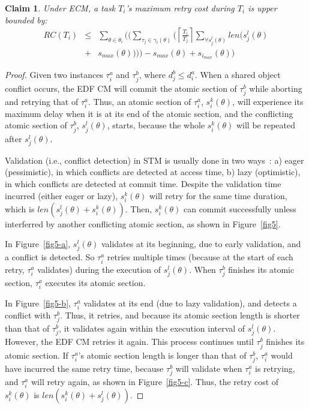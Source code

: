 \documentclass{sig-alternate}
\newtheorem{clm}{Claim}
\begin{document}
\begin{clm}\label{gedf-edf}
Under ECM, a task $T_i$'s maximum retry cost during $T_i$ is upper bounded by:
\begin{eqnarray}
RC\left(T_{i}\right) & \le & \sum_{\theta\in\theta_{i}}\Bigg(\Big(\sum_{\tau_{j}\in\gamma_i(\theta)}\Big(\left\lceil\frac{T_{i}}{T_{j}}\right\rceil\sum_{\forall s_{j}^{l}(\theta)}len\big(s_{j}^{l}(\theta)\nonumber \\
 & + & s_{max}(\theta)\big)\Big)\Big)-s_{max}(\theta)+s_{i_{max}}(\theta)\Bigg)\label{eq3}\end{eqnarray}
\end{clm}
\begin{proof}
Given two instances $\tau_{i}^a$ and $\tau_{j}^b$, where $d_j^b \le d_i^a$. When a shared object conflict occurs, the EDF CM will commit the atomic section of $\tau_j^b$ while aborting and retrying that of $\tau_i^a$.
Thus, an atomic section of $\tau_i^a$, $s_{i}^{k}(\theta)$,
will experience its maximum delay when it is at its end of the atomic section, 
and the conflicting atomic section of $\tau_j^b$, $s_{j}^{l}(\theta)$, starts, because the whole $s_i^k (\theta)$ will be repeated after $s_j^l (\theta)$.

Validation (i.e., conflict detection) in STM is usually done in two ways~\cite{austenmc:tcc:dissertation:2009}: a) eager (pessimistic), in which conflicts are detected at access time, b) lazy (optimistic), in which conflicts are detected at commit time. Despite the validation time incurred (either eager or lazy),  
$s_{i}^{k}(\theta)$ will retry for the same time duration, which is $len(s_{j}^{l}(\theta)+s_i^k(\theta))$. Then, $s_i^k(\theta)$ can commit successfully  
unless interferred by another conflicting atomic section, as shown in Figure~\ref{fig5}. 

In Figure~\ref{fig5-a}, $s_{j}^{l}(\theta)$
validates at its beginning, due to early validation, and a conflict
is detected. So $\tau_{i}^a$ retries multiple times (because at the start of each retry, $\tau_{i}^a$ validates) 
during the execution of $s_{j}^{l}(\theta)$.
When $\tau_{j}^b$ finishes its atomic section, $\tau_{i}^a$ executes its atomic section. 

In Figure~\ref{fig5-b}, 
$\tau_{i}^a$ validates at its end (due to lazy validation), and detects a conflict with $\tau_{j}^b$.
Thus, it retries, and because its atomic section length is shorter
than that of $\tau_{j}^b$, it validates again within the execution
interval of $s_{j}^{l}(\theta)$. However, the EDF CM retries it again.
This process continues until $\tau_{j}^b$ finishes its atomic section.
If $\tau_{i}^a$'s atomic section length is longer than that of $\tau_{j}^b$,
$\tau_{i}^a$ would have incurred the same retry time, because
$\tau_{j}^b$ will validate when $\tau_{i}^a$ is retrying, and $\tau_{i}^a$ will
retry again, as shown in Figure~\ref{fig5-c}. Thus, the retry cost
of $s_{i}^{k}(\theta)$ is $len(s_{i}^{k}(\theta)+s_{j}^{l}(\theta))$.


\end{proof}
\end{document}
